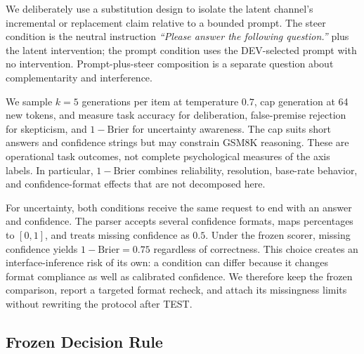 \documentclass[sigconf]{acmart}
\begin{document}
We deliberately use a substitution design to isolate the latent channel's incremental or replacement claim relative to a bounded prompt. The steer condition is the neutral instruction \emph{``Please answer the following question.''} plus the latent intervention; the prompt condition uses the DEV-selected prompt with no intervention. Prompt-plus-steer composition is a separate question about complementarity and interference.

We sample \(k=5\) generations per item at temperature \(0.7\), cap generation at 64 new tokens, and measure task accuracy for deliberation, false-premise rejection for skepticism, and \(1-\mathrm{Brier}\) for uncertainty awareness. The cap suits short answers and confidence strings but may constrain GSM8K reasoning. These are operational task outcomes, not complete psychological measures of the axis labels. In particular, \(1-\mathrm{Brier}\) combines reliability, resolution, base-rate behavior, and confidence-format effects that are not decomposed here.

For uncertainty, both conditions receive the same request to end with an answer and confidence. The parser accepts several confidence formats, maps percentages to \([0,1]\), and treats missing confidence as \(0.5\). Under the frozen scorer, missing confidence yields \(1-\mathrm{Brier}=0.75\) regardless of correctness. This choice creates an interface-inference risk of its own: a condition can differ because it changes format compliance as well as calibrated confidence. We therefore keep the frozen comparison, report a targeted format recheck, and attach its missingness limits without rewriting the protocol after TEST.



\subsection{Frozen Decision Rule}
\end{document}
